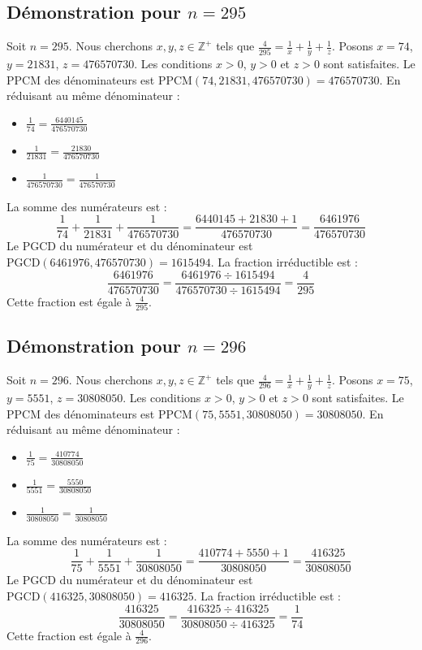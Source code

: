 \documentclass[11pt,a4paper]{article}
\begin{document}
\subsection{Démonstration pour $n = 295$}
Soit $n = 295$. Nous cherchons $x, y, z \in \mathbb{Z}^{+}$ tels que $\frac{4}{295} = \frac{1}{x} + \frac{1}{y} + \frac{1}{z}$.
Posons $x = 74$, $y = 21831$, $z = 476570730$.
Les conditions $x > 0$, $y > 0$ et $z > 0$ sont satisfaites.
Le PPCM des dénominateurs est $\text{PPCM}(74, 21831, 476570730) = 476570730$.
En réduisant au même dénominateur :
\begin{itemize}
    \item $\frac{1}{74} = \frac{6440145}{476570730}$
    \item $\frac{1}{21831} = \frac{21830}{476570730}$
    \item $\frac{1}{476570730} = \frac{1}{476570730}$
\end{itemize}
La somme des numérateurs est :
$$ \frac{1}{74} + \frac{1}{21831} + \frac{1}{476570730} = \frac{6440145 + 21830 + 1}{476570730} = \frac{6461976}{476570730} $$
Le PGCD du numérateur et du dénominateur est $\text{PGCD}(6461976, 476570730) = 1615494$.
La fraction irréductible est :
$$ \frac{6461976}{476570730} = \frac{6461976 \div 1615494}{476570730 \div 1615494} = \frac{4}{295} $$
Cette fraction est égale à $\frac{4}{295}$.

\subsection{Démonstration pour $n = 296$}
Soit $n = 296$. Nous cherchons $x, y, z \in \mathbb{Z}^{+}$ tels que $\frac{4}{296} = \frac{1}{x} + \frac{1}{y} + \frac{1}{z}$.
Posons $x = 75$, $y = 5551$, $z = 30808050$.
Les conditions $x > 0$, $y > 0$ et $z > 0$ sont satisfaites.
Le PPCM des dénominateurs est $\text{PPCM}(75, 5551, 30808050) = 30808050$.
En réduisant au même dénominateur :
\begin{itemize}
    \item $\frac{1}{75} = \frac{410774}{30808050}$
    \item $\frac{1}{5551} = \frac{5550}{30808050}$
    \item $\frac{1}{30808050} = \frac{1}{30808050}$
\end{itemize}
La somme des numérateurs est :
$$ \frac{1}{75} + \frac{1}{5551} + \frac{1}{30808050} = \frac{410774 + 5550 + 1}{30808050} = \frac{416325}{30808050} $$
Le PGCD du numérateur et du dénominateur est $\text{PGCD}(416325, 30808050) = 416325$.
La fraction irréductible est :
$$ \frac{416325}{30808050} = \frac{416325 \div 416325}{30808050 \div 416325} = \frac{1}{74} $$
Cette fraction est égale à $\frac{4}{296}$.
\end{document}
